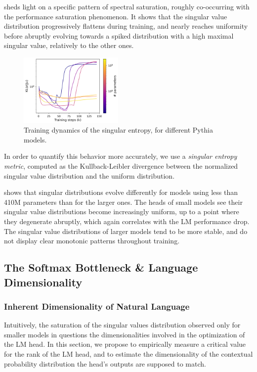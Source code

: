  sheds light on a specific pattern of spectral saturation, roughly co-occurring with the performance saturation phenomenon. It shows that the singular value distribution progressively flattens during training, and nearly reaches uniformity before abruptly evolving towards a spiked distribution with a high maximal singular value, relatively to the other ones.

\begin{figure}
\centering
    \includegraphics[width=0.45\textwidth]{sources/part_1/softmax_bottleneck/imgs/kullback_uni.png}
    \caption{Training dynamics of the singular entropy, for different Pythia models.}
    \vspace{-10pt}

    \label{fig:kl_div}
\end{figure}

In order to quantify this behavior more accurately, we use a \textit{singular entropy metric}, computed as the Kullback-Leibler divergence between the normalized singular value distribution and the uniform distribution.

 shows that singular distributions evolve differently for models using less than 410M parameters than for the larger ones. The heads of small models see their singular value distributions become increasingly uniform, up to a point where they degenerate abruptly, which again correlates with the LM performance drop. The singular value distributions of larger models tend to be more stable, and do not display clear monotonic patterns throughout training.

\subsection{The Softmax Bottleneck \& Language Dimensionality}
\subsubsection{Inherent Dimensionality of Natural Language}
\label{sec:inherent_dim}
Intuitively, the saturation of the singular values distribution observed only for smaller models in  questions the dimensionalities involved in the optimization of the LM head. In this section, we propose to empirically measure a critical value for the rank of the LM head, and to estimate the dimensionality of the contextual probability distribution the head's outputs are supposed to match.


